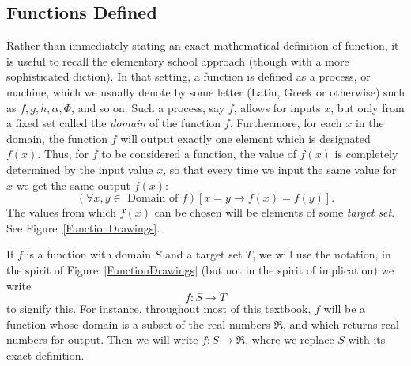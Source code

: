 \subsection{Functions Defined}
Rather than immediately stating an exact mathematical 
definition of function, it is useful to recall the
elementary school approach (though with a more
sophisticated diction).  In that setting, a function
is defined as a process, or machine, which we usually
denote by some letter (Latin, Greek  or otherwise)
such as  $f,g,h,\alpha,\Phi$, and so on.  
Such a process, say $f$, allows for inputs
$x$, but only from a fixed set called the {\it domain} of the function 
$f$.  Furthermore, for each $x$ in the domain,
the function $f$ will output exactly one element 
which is designated $f(x)$.  Thus, for $f$ to be considered
a function, the value of $f(x)$ is completely determined
by the input value $x$, so that every time we input the same
value for $x$ we get the same output $f(x)$:
$$(\forall x,y\in\text{ Domain of }f)[x=y\longrightarrow f(x)=f(y)].$$  
The values from which $f(x)$ can be chosen will be elements of
some {\it target set}.\footnotemark
See Figure~\ref{FunctionDrawings}.

If $f$ is a function with domain $S$ and a target set $T$,
we will use the notation, in the spirit of Figure~\ref{FunctionDrawings}
(but not in the spirit of implication) we write
\begin{equation}
f:S\longrightarrow T\end{equation}
to signify this.  For instance, throughout most of this
textbook, $f$ will be a function whose domain is 
a subset of the real numbers $\Re$, and which returns
real numbers for output.  Then we will write
$f:S\longrightarrow\Re$, where we replace $S$ with its
exact definition.  

